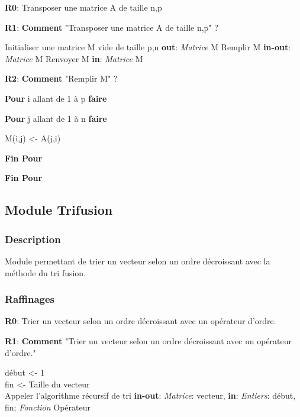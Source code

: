 \documentclass{NewTeXRaffinage}
\begin{document}
\textbf{R0}: Transposer une matrice A de taille n,p

\textbf{R1}: \textbf{Comment} "Transposer une matrice A de taille n,p" ?
\begin{addmargin}[5em]{0pt}
    Initialiser une matrice M vide de taille p,n \hspace*{0pt}\hfill \textbf{out}: \textit{Matrice} M 
    \newline Remplir M \hspace*{0pt}\hfill \textbf{in-out}: \textit{Matrice} M 
    \newline Renvoyer M \hspace*{0pt}\hfill \textbf{in}: \textit{Matrice} M 
\end{addmargin}

\textbf{R2}: \textbf{Comment} "Remplir M" ?
\begin{addmargin}[5em]{0pt}
    \textbf{Pour} i allant de 1 à p \textbf{faire}
    \begin{addmargin}[3em]{0pt}
        \textbf{Pour} j allant de 1 à n \textbf{faire}
        \begin{addmargin}[3em]{0pt}
            M(i,j) <- A(j,i)
        \end{addmargin}
        \textbf{Fin Pour}
    \end{addmargin}
    \textbf{Fin Pour}
\end{addmargin}


\subsection{Module Trifusion}

\subsubsection{Description}

Module permettant de trier un vecteur selon un ordre décroissant avec la méthode du tri fusion.

\subsubsection{Raffinages}

\textbf{R0}: Trier un vecteur selon un ordre décroissant avec un opérateur d'ordre.

\textbf{R1}: \textbf{Comment} "Trier un vecteur selon un ordre décroissant avec un opérateur d'ordre."
\begin{addmargin}[5em]{0pt}
    début <- 1 \\
    fin <- Taille du vecteur \\
    Appeler l'algorithme récursif de tri \hspace*{0pt}\hfill \textbf{in-out}: \textit{Matrice}: vecteur, \textbf{in}: \textit{Entiers}: début, fin; \textit{Fonction} Opérateur
\end{addmargin}
\end{document}
